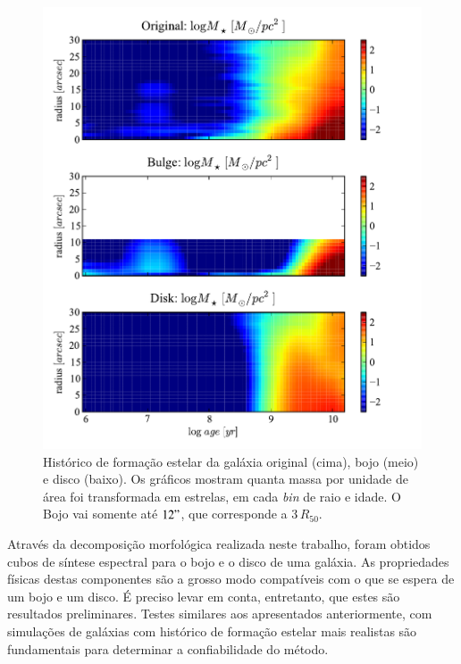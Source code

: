 \begin{figure}
	\includegraphics{figuras/decomp-sfh}
	\caption[Histórico de formação estelar do bojo, disco, e total] {Histórico de
	formação estelar da galáxia original (cima), bojo (meio) e disco (baixo). Os
	gráficos mostram quanta massa por unidade de área foi transformada em estrelas,
	em cada {\em bin} de raio e idade. O Bojo vai somente até $12"$, que
	corresponde a $3\,R_{50}$.}
	\label{fig:decompSynSfh}
\end{figure}

Através da decomposição morfológica realizada neste trabalho, foram obtidos
cubos de síntese espectral para o bojo e o disco de uma galáxia. As propriedades
físicas destas componentes são a grosso modo compatíveis com o que se espera de
um bojo e um disco. É preciso levar em conta, entretanto, que estes são resultados
preliminares. Testes similares aos apresentados anteriormente, com simulações de
galáxias com histórico de formação estelar mais realistas são fundamentais para
determinar a confiabilidade do método.

